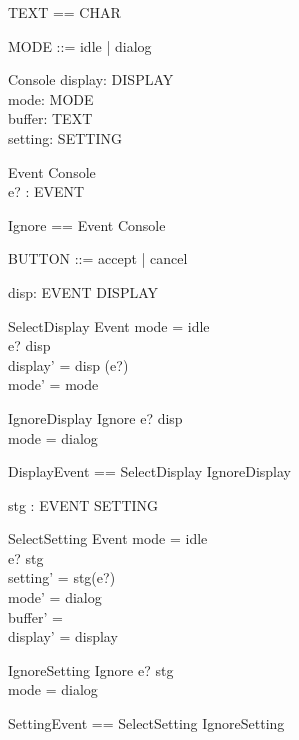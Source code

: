 \documentclass{llncs}
\begin{document}
\begin{zed}
\end{zed}

\begin{zed}
TEXT == \seq CHAR
\end{zed}

\begin{zed}
MODE ::= idle | dialog
\end{zed}

\begin{schema}{Console}
display: DISPLAY \\
mode: MODE \\
buffer: TEXT \\
setting: SETTING
\end{schema}

\begin{schema}{Event}
\Delta Console\\
e? : EVENT
\end{schema}
\begin{zed}
Ignore == Event \land \Xi Console
\end{zed}

\begin{zed}
BUTTON ::= accept | cancel
\end{zed}

\begin{axdef}
disp: EVENT \pfun DISPLAY
\end{axdef}
\begin{schema}{SelectDisplay}
Event 
\where mode = idle \\
e? \in \dom disp \\
display' = disp (e?) \\
mode' = mode
\end{schema}
\begin{schema}{IgnoreDisplay}
Ignore 
\where e? \in \dom disp\\
mode = dialog
\end{schema}
\begin{zed}
DisplayEvent == SelectDisplay \lor IgnoreDisplay
\end{zed}

\begin{axdef}
stg : EVENT \pfun SETTING
\end{axdef}
\begin{schema}{SelectSetting}
Event 
\where mode = idle \\
e? \in \dom stg \\
setting' = stg(e?) \\
mode' = dialog \\
buffer' = \emptyset \\
display' = display
\end{schema}
\begin{schema}{IgnoreSetting}
Ignore 
\where e? \in \dom stg \\
mode = dialog
\end{schema}
\begin{zed}
SettingEvent == SelectSetting \lor IgnoreSetting
\end{zed}
\end{document}
